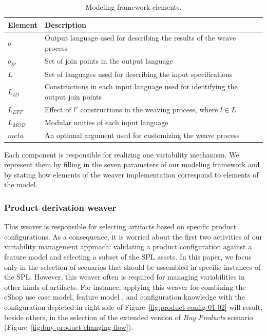 \documentclass{acm_proc_article-sp}
\begin{document}
\begin{table}[h]
\begin{center}
\caption{Modeling framework elements.} \label{tab:tup-01}
\begin{tabular}{|p{0.6in}|p{2.4in}|}
  \hline
  {\bf Element} & {\bf Description} \\ 
   \hline
  $o$              & Output language used for describing the results of the weave process \\ \hline
  $o_{jp}$       & Set of join points in the output language \\ \hline
  $L$              & Set of languages used for describing the input specifications \\ \hline
  $L_{ID}$      & Constructions in each input language used for identifying the output join points \\ \hline 
  $L_{EFF}$   & Effect of $l'$ constructions in the weaving process, where $l \in L$ \\ \hline
  $L_{MOD}$  & Modular unities of each input language \\ \hline
  $meta$         & An optional argument used for customizing the weave process \\ 
  \hline
\end{tabular}
\end{center}
\end{table}

Each component is responsible for realizing one variability mechanism. We represent them by 
filling in the seven parameters of our modeling framework and by stating 
how elements of the weaver implementation correspond to elements of the model.

\subsubsection{Product derivation weaver}\label{sub:pd-weaver}

This weaver is responsible for selecting artifacts based on specific product configurations. 
As a consequence, it is worried about the first two activities of our variability management approach: 
validating a product configuration against  a feature model and selecting a subset of the SPL assets. 
In this paper, we focus only in the selection of scenarios that should be assembled in specific instances 
of the SPL. However, this weaver often is required for managing variabilities in other kinds of artifacts.  
For instance, applying this weaver for combining the eShop use case model, feature model , and configuration knowledge with the configuration depicted in right side of Figure~\ref{fig:product-config-01-02} will result, beside others, in the selection of the extended version of \emph{Buy Products} scenario (Figure~\ref{fig:buy-product-changing-flow}).  
 
\end{document}
